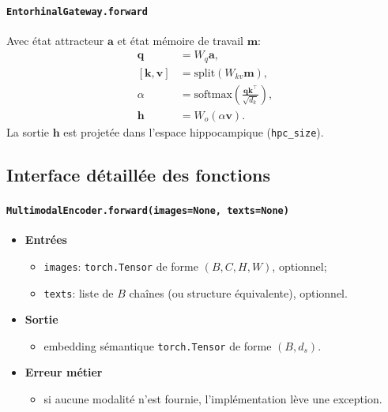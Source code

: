 \documentclass[12pt,a4paper]{article}
\begin{document}
\paragraph{\texttt{EntorhinalGateway.forward}}
Avec état attracteur $\mathbf{a}$ et état mémoire de travail $\mathbf{m}$:
\begin{align}
\mathbf{q} &= W_q\mathbf{a},\\
[\mathbf{k},\mathbf{v}] &= \mathrm{split}(W_{kv}\mathbf{m}),\\
\alpha &= \mathrm{softmax}\!\left(\frac{\mathbf{q}\mathbf{k}^\top}{\sqrt{d_k}}\right),\\
\mathbf{h} &= W_o(\alpha\mathbf{v}).
\end{align}
La sortie $\mathbf{h}$ est projetée dans l'espace hippocampique (\texttt{hpc\_size}).

\subsection{Interface détaillée des fonctions}

\paragraph{\texttt{MultimodalEncoder.forward(images=None, texts=None)}}
\begin{itemize}[leftmargin=*]
    \item \textbf{Entrées}
    \begin{itemize}
        \item \texttt{images}: \texttt{torch.Tensor} de forme $(B, C, H, W)$, optionnel;
        \item \texttt{texts}: liste de $B$ chaînes (ou structure équivalente), optionnel.
    \end{itemize}
    \item \textbf{Sortie}
    \begin{itemize}
        \item embedding sémantique \texttt{torch.Tensor} de forme $(B, d_s)$.
    \end{itemize}
    \item \textbf{Erreur métier}
    \begin{itemize}
        \item si aucune modalité n'est fournie, l'implémentation lève une exception.
    \end{itemize}
\end{itemize}
\end{document}
